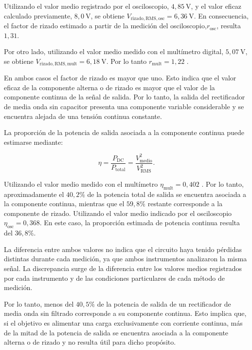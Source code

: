 Utilizando el valor medio registrado por el osciloscopio, $4{,}85\ \mathrm{V}$, y el valor eficaz calculado previamente, $8{,}0\ \mathrm{V}$, se obtiene $V_{\mathrm{rizado,RMS,osc}} =6{,}36\ \mathrm{V}$. En consecuencia, el factor de rizado estimado a partir de la medición
del osciloscopio,$r_{\mathrm{osc}}$, resulta  $1{,}31$. 

Por otro lado, utilizando el valor medio medido con el multímetro digital, $5{,}07\ \mathrm{V}$, se obtiene $V_{\mathrm{rizado,RMS,mult}}=6{,}18\ \mathrm{V}$. Por lo tanto $r_{\mathrm{mult}}=1{,}22$ .

En ambos casos el factor de rizado es mayor que uno. Esto indica que el valor eficaz de la componente alterna o de rizado es mayor que el valor de la componente continua de la señal de salida. Por lo tanto, la salida del rectificador de media onda sin capacitor presenta una componente variable considerable y se encuentra alejada de una tensión continua
constante.

La proporción de la potencia de salida asociada a la componente continua puede estimarse mediante:

\begin{equation}
    \eta
    =
    \frac{P_{\mathrm{DC}}}{P_{\mathrm{total}}}
    =
    \frac{V_{\mathrm{medio}}^2}
    {V_{\mathrm{RMS}}^2}.
\end{equation}

Utilizando el valor medio medido con el multímetro $\eta_{\mathrm{mult}}=0{,}402$ . Por lo tanto, aproximadamente el $40{,}2\%$ de la potencia total de salida se encuentra asociada a la componente continua, mientras que el $59{,}8\%$ restante corresponde a la componente de rizado.  Utilizando el valor medio indicado por el osciloscopio $\eta_{\mathrm{osc}}=0{,}368$. En este caso, la proporción estimada de potencia continua resulta del $36{,}8\%$.

La diferencia entre ambos valores no indica que el circuito haya tenido pérdidas distintas durante cada medición, ya que ambos instrumentos analizaron la misma señal. La discrepancia surge de la diferencia entre los valores medios registrados por cada instrumento y de las condiciones particulares de cada método de medición.

Por lo tanto, menos del $40{,}5\%$ de la potencia de salida de un rectificador de media onda sin filtrado corresponde a su componente continua. Esto implica que, si el objetivo es alimentar una carga exclusivamente con corriente continua, más de la mitad de la potencia de salida se encuentra asociada a la componente alterna o de rizado y no resulta útil para dicho propósito. 

